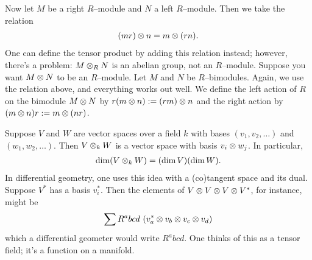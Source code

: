 \documentclass[11pt, oneside,margin=1in]{article}
\begin{document}
Now let $M$ be a right $R$--module and $N$ a left $R$--module. Then we take the relation \begin{align*}
	(mr) \otimes n = m\otimes (rn).
\end{align*}
One can define the tensor product by adding this relation instead; however, there's a problem: $M\otimes_R N$ is an abelian group, not an $R$--module. Suppose you want $M\otimes N$ to be an $R$--module. Let $M$ and $N$ be $R$--bimodules. Again, we use the relation above, and everything works out well. We define the left action of $R$ on the bimodule $M\otimes N$ by $r(m\otimes n) := (rm) \otimes n$ and the right action by $(m\otimes n) r:= m\otimes(nr)$.
\begin{example}
Suppose $V$ and $W$ are vector spaces over a field $k$ with bases $(v_1,v_2,\hdots)$ and $(w_1,w_2,\hdots)$. Then $V\otimes_k W$ is a vector space with basis $v_i\otimes w_j$. In particular, \begin{align*}
	\dim (V\otimes_k W) = (\dim V)  (\dim W).
\end{align*}
In differential geometry, one uses this idea with a (co)tangent space and its dual. Suppose $V^*$ has a basis $v_i^*$. Then the elements of $V\otimes V\otimes V \otimes V^*$, for instance, might be
\begin{align*}
	\sum R^a bcd\ ( v_a^* \otimes v_b \otimes v_c \otimes v_d)
\end{align*}
which a differential geometer would write $R^abcd$. One thinks of this as a tensor field; it's a function on a manifold.
\end{example}
\end{document}
